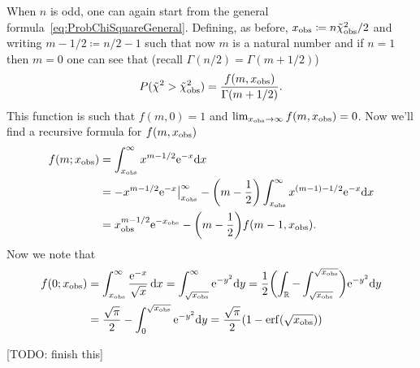 \documentclass[
	10pt,
	draft
]{scrreprt}
\DeclareMathOperator\erf{erf}
\newcommand{\eu}{\ensuremath{\mathrm{e}}}
\begin{document}
When $n$ is odd, one can again start from the general formula~\eqref{eq:ProbChiSquareGeneral}.
Defining, as before, $x_\textup{obs} \coloneqq n\tilde\chi^2_\textup{obs}/2$ and writing $m -1/2\coloneqq n/2-1$ such that now $m$ is a natural number and if $n=1$ then $m=0$ one can see that (recall $\Gamma(n/2) = \Gamma(m+1/2)$)
\begin{equation}
P(\tilde\chi^2>\tilde\chi^2_\textup{obs}) = \frac{f(m,x_\textup{obs})}{\Gamma(m+1/2)}.
\end{equation}
This function is such that $f(m,0) = 1$ and $\lim_{x_\textup{obs}\to\infty}f(m,x_\textup{obs}) = 0$.
Now we'll find a recursive formula for $f(m,x_\textup{obs})$
\begin{equation}
\begin{aligned}
f(m;x_\textup{obs})
&=  \int_{x_\textup{obs}}^\infty x^{m-1/2}\eu^{-x}\!\ud x\\
&= -x^{m-1/2}\eu^{-x}\big\rvert_{x_\textup{obs}}^\infty - \biggl(m-\frac{1}{2}\biggr) \int_{x_\textup{obs}}^\infty x^{(m-1)-1/2}\eu^{-x}\!\ud x\\
&= x_\textup{obs}^{m-1/2}\eu^{-x_\textup{obs}}- \biggl(m-\frac{1}{2}\biggr) f(m-1,x_\textup{obs}).
\end{aligned}
\end{equation}
Now we note that
\begin{equation}
\begin{aligned}
f(0;x_\textup{obs})
&=  \int_{x_\textup{obs}}^\infty \frac{\eu^{-x}}{\sqrt{x}}\ud x
=  \int_{\sqrt{x_\textup{obs}}}^\infty \eu^{-y^2}\!\ud y
= \frac{1}{2}\biggl(\int_\R - \int_{\sqrt{x_\textup{obs}}}^{\sqrt{x_\textup{obs}}}\biggr) \eu^{-y^2}\!\ud y\\
&= \frac{\sqrt{\pi}}{2} - \int_0^{\sqrt{x_\textup{obs}}}\eu^{-y^2}\!\ud y
=  \frac{\sqrt{\pi}}{2}(1-\erf(\sqrt{x_\textup{obs}}))
\end{aligned}
\end{equation}

[TODO: finish this]
\end{document}
